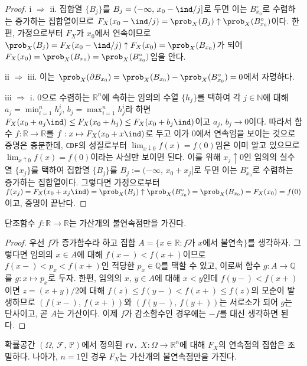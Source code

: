 \begin{proof}
    i $\Rightarrow$ ii. 집합열 $\{B_j\}$를 $B_j=(-\infty,\,x_0-\ind/j]$로 두면 이는 $B_{x_0}^\circ$로 수렴하는 증가하는 집합열이므로 $F_X(x_0-\ind/j)=\prob_X(B_j)\uparrow\prob_X(B_{x_0}^\circ)$이다. 한편, 가정으로부터 $F_X$가 $x_0$에서 연속이므로 $\prob_X(B_j)=F_X(x_0-\ind/j)\uparrow F_X(x_0)=\prob_X(B_{x_0})$가 되어 $F_X(x_0)=\prob_X(B_{x_0})=\prob_X(B_{x_0}^\circ)$임을 안다.

    ii $\Rightarrow$ iii. 이는 $\prob_X(\partial B_{x_0})=\prob_X(B_{x_0})-\prob_X(B_{x_0}^\circ)=0$에서 자명하다.

    iii $\Rightarrow$ i. $0$으로 수렴하는 $\mathbb{R}^n$에 속하는 임의의 수열 $\{h_j\}$를 택하여 각 $j\in\mathbb{N}$에 대해 $a_j=\min_{i=1}^nh_j^i,\,b_j=\max_{i=1}^nh_j^i$라 하면 $F_X(x_0+a_j\ind)\leq F_X(x_0+h_j)\leq F_X(x_0+b_j\ind)$이고 $a_j,\,b_j\to 0$이다. 따라서 함수 $f:\mathbb{R}\to\mathbb{R}$를 $f:x\mapsto F_X(x_0+x\ind)$로 두고 이가 $0$에서 연속임을 보이는 것으로 증명은 충분한데, \texttt{CDF}의 성질로부터 $\lim_{x\downarrow0}f(x)=f(0)$임은 이미 알고 있으므로 $\lim_{x\uparrow0}f(x)=f(0)$이라는 사실만 보이면 된다. 이를 위해 $x_j\uparrow0$인 임의의 실수열 $\{x_j\}$를 택하여 집합열 $\{B_j\}$를 $B_j:=(-\infty,\,x_0+x_j]$로 두면 이는 $B_{x_0}^\circ$로 수렴하는 증가하는 집합열이다. 그렇다면 가정으로부터 $f(x_j)=F_X(x_0+x_j\ind)=\prob_X(B_j)\uparrow\prob_X(B_{x_0}^\circ)=\prob_X(B_{x_0})=F_X(x_0)=f(0)$이고, 증명이 끝난다.
\end{proof}

\begin{lemma}\label{lem:monotoneDiscontinuity}
    단조함수 $f:\mathbb{R}\to\mathbb{R}$는 가산개의 불연속점만을 가진다.
\end{lemma}

\begin{proof}
    우선 $f$가 증가함수라 하고 집합 $A=\{x\in\mathbb{R}:f\textrm{가 $x$에서 불연속}\}$를 생각하자. 그렇다면 임의의 $x\in A$에 대해 $f(x-)<f(x+)$이므로 $f(x-)<p_x<f(x+)$인 적당한 $p_x\in\mathbb{Q}$를 택할 수 있고, 이로써 함수 $g:A\to\mathbb{Q}$를 $g:x\mapsto p_x$로 두자. 한편, 임의의 $x,\,y\in A$에 대해 $x<y$인데 $f(y-)<f(x+)$이면 $z=(x+y)/2$에 대해 $f(z)\leq f(y-)<f(x+)\leq f(z)$의 모순이 발생하므로 $(f(x-),\,f(x+))$와 $(f(y-),\,f(y+))$는 서로소가 되어 $g$는 단사이고, 곧 $A$는 가산이다. 이제 $f$가 감소함수인 경우에는 $-f$를 대신 생각하면 된다.
\end{proof}

\begin{theorem}\label{thm:CDFContinuousDense}
    확률공간 $(\Omega,\,\mathcal{F},\,\mathbb{P})$에서 정의된 \texttt{rv.} $X:\Omega\to\mathbb{R}^n$에 대해 $F_X$의 연속점의 집합은 조밀하다. 나아가, $n=1$인 경우 $F_X$는 가산개의 불연속점만을 가진다.
\end{theorem}

